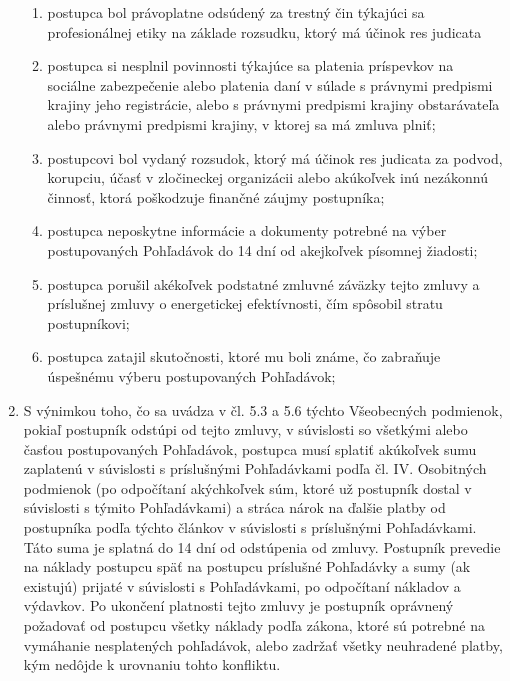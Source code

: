 \documentclass[a4paper]{article}
\begin{document}
\begin{multicols}{2}
\begin{enumerate}
\begin{enumerate}
\item postupca bol právoplatne odsúdený za trestný čin týkajúci sa profesionálnej etiky na základe rozsudku, ktorý má účinok res judicata
\item postupca si nesplnil povinnosti týkajúce sa platenia príspevkov na sociálne zabezpečenie alebo platenia daní v súlade s právnymi predpismi krajiny jeho registrácie, alebo s právnymi predpismi krajiny obstarávateľa alebo právnymi predpismi krajiny, v ktorej sa má zmluva plniť;
\item postupcovi bol vydaný rozsudok, ktorý má účinok res judicata za podvod, korupciu, účasť v zločineckej organizácii alebo akúkoľvek inú nezákonnú činnosť, ktorá poškodzuje finančné záujmy postupníka;
\item postupca neposkytne informácie a dokumenty potrebné na výber postupovaných Pohľadávok do 14 dní od akejkoľvek písomnej žiadosti;
\item postupca porušil akékoľvek podstatné zmluvné záväzky tejto zmluvy a príslušnej zmluvy o energetickej efektívnosti, čím spôsobil stratu postupníkovi;
\item postupca zatajil skutočnosti, ktoré mu boli známe, čo zabraňuje úspešnému výberu postupovaných Pohľadávok;    
\end{enumerate} 
\item S výnimkou toho, čo sa uvádza v čl. 5.3 a 5.6 týchto Všeobecných podmienok, pokiaľ postupník odstúpi od tejto zmluvy, v súvislosti so všetkými alebo časťou postupovaných Pohľadávok, postupca musí splatiť akúkoľvek sumu zaplatenú v súvislosti s príslušnými Pohľadávkami podľa čl. IV. Osobitných podmienok (po odpočítaní akýchkoľvek súm, ktoré už postupník dostal v súvislosti s týmito Pohľadávkami) a stráca nárok na ďalšie platby od postupníka podľa týchto článkov v súvislosti s príslušnými Pohľadávkami. Táto suma je splatná do 14 dní od odstúpenia od zmluvy. Postupník prevedie na náklady postupcu späť na postupcu príslušné Pohľadávky a sumy (ak existujú) prijaté v súvislosti s Pohľadávkami, po odpočítaní nákladov a výdavkov. 	
Po ukončení platnosti tejto zmluvy je postupník oprávnený požadovať od postupcu všetky náklady podľa zákona, ktoré sú potrebné na vymáhanie nesplatených pohľadávok, alebo zadržať všetky neuhradené platby, kým nedôjde k urovnaniu tohto konfliktu.
\end{enumerate}


\end{multicols}
\end{document}
